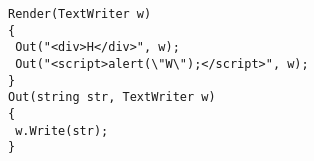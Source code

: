 \begin{lstlisting}[language={[Sharp]C}, caption={Example code where
inline script and regular HTML can be output at the same \dotwrite.},
label=code:reason-for-guards, float] 
Render(TextWriter w)
{
 Out("<div>H</div>", w);
 Out("<script>alert(\"W\");</script>", w);
}
Out(string str, TextWriter w)
{ 
 w.Write(str); 
}
\end{lstlisting}
